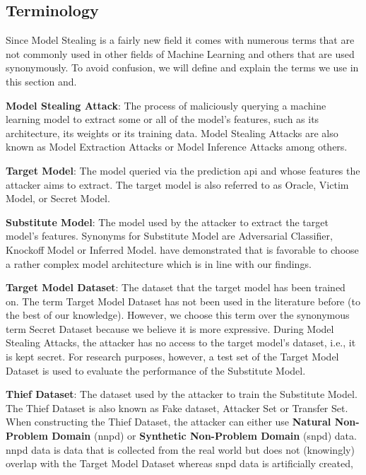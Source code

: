 \subsection{Terminology}
\label{sec:ModelStealing:Terminology}
Since Model Stealing is a fairly new field it comes with numerous terms that are not commonly used in other fields of Machine Learning and others that are used 
synonymously. To avoid confusion, we will define and explain the terms we use in this section and. \par
\textbf{Model Stealing Attack}: The process of maliciously querying a machine learning model to extract some or all of the model's features, such as its
architecture, its weights or its training data. Model Stealing Attacks are also known as Model Extraction Attacks or Model Inference Attacks among others. \par
\textbf{Target Model}: The model queried via the prediction \gls{api} and whose features the attacker aims to extract. The target model is also referred to as Oracle, Victim Model, or Secret Model. \par
\textbf{Substitute Model}: The model used by the attacker to extract the target model's features. Synonyms for Substitute Model are Adversarial Classifier,
Knockoff Model or Inferred Model. \cite{orekondy2019knockoff} have demonstrated that is favorable to choose a rather complex model architecture which is in line with 
our findings.\par
\textbf{Target Model Dataset}: The dataset that the target model has been trained on. The term Target Model Dataset has not been used in the literature before (to 
the best of our knowledge). However, we choose this term over the synonymous term Secret Dataset because we believe it is more expressive. During Model Stealing Attacks,
the attacker has no access to the target model's dataset, i.e., it is kept secret. For research purposes, however, a test set of the Target Model Dataset is
used to evaluate the performance of the Substitute Model. \par
\textbf{Thief Dataset}: The dataset used by the attacker to train the Substitute Model. The Thief Dataset is also known as Fake dataset, Attacker Set or 
Transfer Set. When constructing the Thief Dataset, the attacker can either use \textbf{Natural Non-Problem Domain} (\gls{nnpd}) or \textbf{Synthetic Non-Problem Domain} (\gls{snpd})
data. \gls{nnpd} data is data that is collected from the real world but does not (knowingly) overlap with the Target Model Dataset whereas \gls{snpd} data is artificially created,
